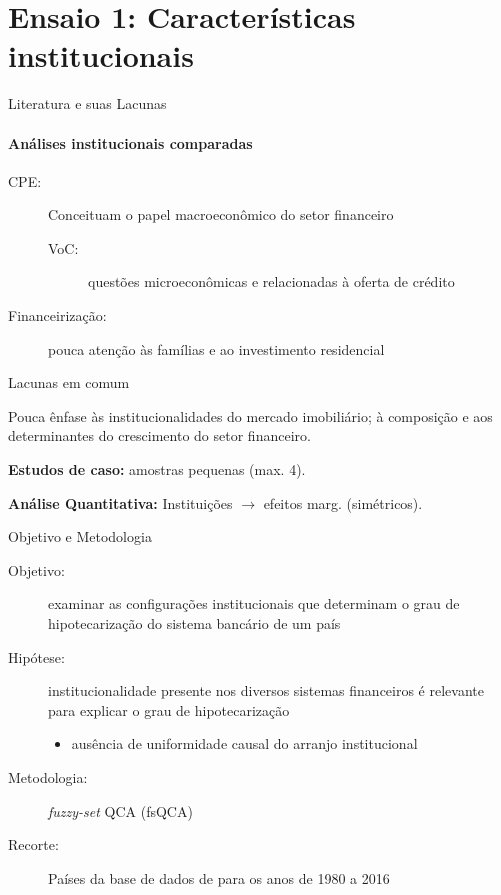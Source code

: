 \documentclass[11pt]{beamer}
\begin{document}
\section[QCA]{\textbf{Ensaio 1:} Características institucionais}

\begin{frame}{Literatura e suas Lacunas}
\framesubtitle{Análises institucionais comparadas}

\begin{description}
    \item[CPE:] Conceituam o papel macroeconômico do setor financeiro
        \begin{description}
            \item[VoC:] questões microeconômicas e relacionadas à oferta de crédito
        \end{description}
    \item[Financeirização:] pouca atenção às famílias e ao investimento residencial
\end{description}

\begin{alert}{Lacunas em comum}

Pouca ênfase às institucionalidades do mercado imobiliário; à composição e aos determinantes
do crescimento do setor financeiro.

\textbf{Estudos de caso:} amostras pequenas (max. 4).

\textbf{Análise Quantitativa:} Instituições $\to$ efeitos marg. (simétricos).

\end{alert}

\end{frame}


\begin{frame}{Objetivo e Metodologia}

\begin{description}
    \item[Objetivo:]  examinar as configurações institucionais que determinam o grau de hipotecarização do sistema bancário de um país
    \item[Hipótese:] institucionalidade presente nos diversos sistemas financeiros é relevante para explicar o grau de hipotecarização
        \begin{itemize}
            \item ausência de uniformidade causal do arranjo institucional \cite{chang_institutions_2011}
        \end{itemize}
    \item[Metodologia:] \textit{fuzzy-set} QCA (fsQCA)
    \item[Recorte:] Países da base de dados de \textcite{jorda_rate_2019} para os anos de 1980 a 2016
\end{description}
\end{frame}
\end{document}
